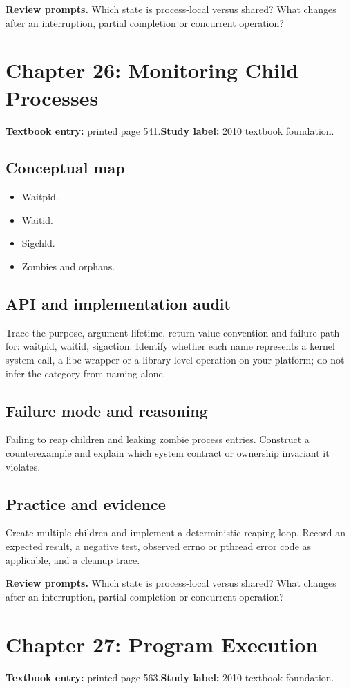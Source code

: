 \documentclass[11pt,letterpaper,oneside]{report}
\begin{document}
\textbf{Review prompts.} Which state is process-local versus shared? What changes after an interruption, partial completion or concurrent operation?

\section{Chapter 26: Monitoring Child Processes}
\textbf{Textbook entry:} printed page 541.\quad \textbf{Study label:} 2010 textbook foundation.

\subsection{Conceptual map}
\begin{itemize}
\item Waitpid.
\item Waitid.
\item Sigchld.
\item Zombies and orphans.
\end{itemize}
\subsection{API and implementation audit}
Trace the purpose, argument lifetime, return-value convention and failure path for: waitpid, waitid, sigaction. Identify whether each name represents a kernel system call, a libc wrapper or a library-level operation on your platform; do not infer the category from naming alone.

\subsection{Failure mode and reasoning}
Failing to reap children and leaking zombie process entries. Construct a counterexample and explain which system contract or ownership invariant it violates.

\subsection{Practice and evidence}
Create multiple children and implement a deterministic reaping loop. Record an expected result, a negative test, observed errno or pthread error code as applicable, and a cleanup trace.

\textbf{Review prompts.} Which state is process-local versus shared? What changes after an interruption, partial completion or concurrent operation?

\section{Chapter 27: Program Execution}
\textbf{Textbook entry:} printed page 563.\quad \textbf{Study label:} 2010 textbook foundation.
\end{document}
